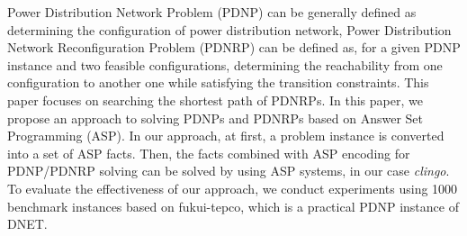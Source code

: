 Power Distribution Network Problem (PDNP) can be generally 
defined as determining the configuration of power distribution network,
Power Distribution Network Reconfiguration Problem (PDNRP) can be
defined as, for a given PDNP instance and two feasible configurations,
determining the reachability from one configuration to another one
while satisfying the transition constraints.
This paper focuses on searching the shortest path of PDNRPs.
%
In this paper, we propose an approach to solving PDNPs and PDNRPs
based on Answer Set Programming (ASP).
In our approach, at first, a problem instance is converted into 
a set of ASP facts. 
Then, the facts combined with ASP encoding
for PDNP/PDNRP solving can be solved by using ASP systems,
in our case \textit{clingo}.
%
To evaluate the effectiveness of our approach, we conduct experiments
using 1000 benchmark instances based on
\textsf{fukui-tepco}, which is a practical PDNP instance of DNET.

